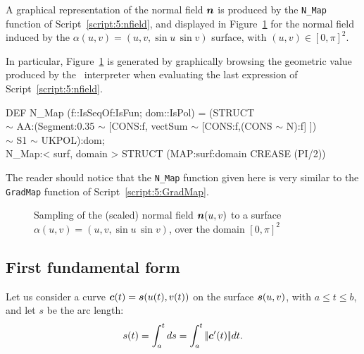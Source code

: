 \documentclass{31x47jw}
\begin{document}
\begin{example}
    
A graphical representation of the normal field ${\mbox{\boldmath $n$}}$ is produced by
the \texttt{N\_Map} function of Script~\ref{script:5:nfield}, and
displayed in Figure~\ref{fig:5:nfield} for the normal field induced by
the $\alpha(u,v)=(u,v,\sin u\, \sin v)$ surface, with
$(u,v)\in[0,\pi]^{2}$.  

In particular, Figure~\ref{fig:5:nfield} is generated by graphically
browsing the geometric value produced by the \pl\ interpreter when
evaluating the last expression of Script~\ref{script:5:nfield}.

\begin{script}
\begin{smallplasm}
DEF N\_Map (f::IsSeqOf:IsFun; dom::IsPol) = (STRUCT \+\\
    $\sim$  AA:(Segment:0.35  $\sim$  [CONS:f, vectSum  $\sim$  [CONS:f,(CONS $\sim$ N):f] ])\\
    $\sim$  S1  $\sim$  UKPOL):dom;\-\\[0.3cm]

N\_Map:< surf, domain > STRUCT (MAP:surf:domain CREASE (PI/2))
\end{smallplasm}
\label{script:5:nfield}
\end{script}

The reader should notice that the \texttt{N\_Map} function given here
is very similar to the \texttt{GradMap} function of
Script~\ref{script:5:GradMap}. 

\begin{figure}[h]
\centering{}
\caption{Sampling of the (scaled) normal field ${\mbox{\boldmath $n$}}(u,v)$ to a surface 
$\alpha(u,v)=(u,v,\sin u\, \sin v)$, over the domain $[0,\pi]^{2}$
\label{fig:5:nfield}}
\end{figure}

\label{ex:5:nfield}
\end{example}


\subsection{First fundamental form}

Let us consider a curve ${\mbox{\boldmath $c$}}(t) = {\mbox{\boldmath $s$}}(u(t), v(t))$ on the surface 
${\mbox{\boldmath $s$}}(u,v)$, with $a\leq t\leq b$, and let $s$ be the arc length:
\[
s(t) = \int_{a}^{t} ds = \int_{a}^{t} {\left|\!\left|{\mbox{\boldmath $c$}}'(t)\right|\!\right|} dt.
\]
\end{document}

